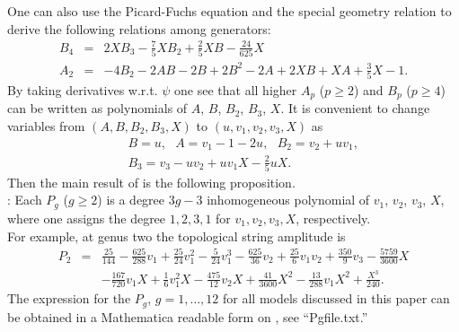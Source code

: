 \documentclass[12pt]{article}
\begin{document}
One can also use the Picard-Fuchs equation and the special
geometry relation to derive the following relations among
generators:
\begin{eqnarray}
B_4&=&2XB_3-\frac{7}{5}XB_2+\frac{2}{5}XB-\frac{24}{625}X \nonumber \\
A_2&=& -4B_2-2AB-2B+2B^2-2A+2XB+XA+\frac{3}{5}X-1.
\end{eqnarray}
By taking derivatives w.r.t. $\psi$ one see that all higher $A_p$
($p\geq 2$) and $B_p$ ($p\geq 4$) can be written as polynomials of
$A$, $B$, $B_2$, $B_3$, $X$. It is convenient to change variables
from $(A,B,B_2,B_3,X)$ to $(u,v_1,v_2,v_3,X)$ as
\begin{eqnarray}
&& B=u, ~~~ A=v_1-1-2u,~~~ B_2=v_2+uv_1, \nonumber \\
&& B_3=v_3-uv_2+uv_1X-\frac{2}{5}uX.
\end{eqnarray}
Then the  main result of \cite{Yamaguchi} is the following
proposition.
\\

: Each $P_g$ ($g\geq 2$) is a degree
$3g-3$ inhomogeneous polynomial of $v_1$, $v_2$, $v_3$, $X$, where
one assigns the degree $1,2,3,1$ for $v_1, v_2, v_3, X$,
respectively.
\\

For example, at genus two the topological string amplitude is
\begin{eqnarray}
P_2 &=& \frac{25}{144} - \frac{625}{288} v_1 + \frac{25}{24} v_1^2
- \frac{5}{24}v_1^3 - \frac{625}{36}v_2 + \frac{25}{6}v_1v_2 +
\frac{350}{9}v_3 - \frac{5759}{3600}X  \nonumber \\ && -
\frac{167}{720}v_1X + \frac{1}{6}v_1^2X - \frac{475}{12}v_2X +
\frac{41}{3600}X^2- \frac{13}{288}v_1X^2 + \frac{X^3}{240}.
\end{eqnarray}
The expression for the $P_g$, $g=1,\ldots,12 $ for all models
discussed in this paper can be obtained in a
Mathematica readable form on \cite{webpage}, see ``Pgfile.txt.''

\end{document}
